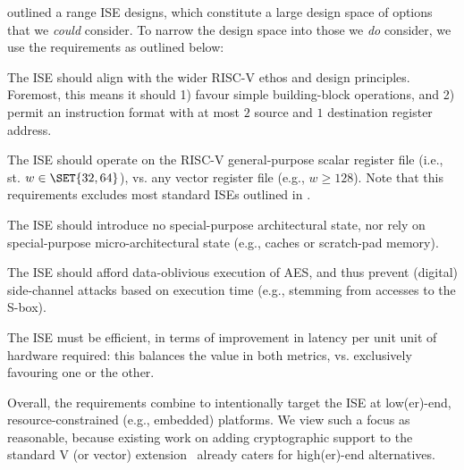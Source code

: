 
outlined a range ISE designs, which constitute a large design space of
options that we {\em could} consider.  To narrow the design space into
those we {\em do} consider, we use the requirements as outlined below:

\begin{requirement}
The ISE should align with the wider RISC-V ethos and design principles.
Foremost, this means it should 
1) favour simple building-block operations,
   and
2) permit an instruction format with at most $2$ source and $1$ destination register address.
\end{requirement}

\begin{requirement}
The ISE should operate on 
the RISC-V general-purpose scalar register file 
(i.e., st. $w \in \SET{32,64}$),
vs. 
any                        vector register file
(e.g., $w \ge 128$).
Note that this requirements excludes most standard ISEs outlined in 
.
\end{requirement}

\begin{requirement}
The ISE should introduce no
special-purpose       architectural state, 
nor rely on
special-purpose micro-architectural state
(e.g., caches or scratch-pad memory).
\end{requirement}

\begin{requirement}
The ISE should afford data-oblivious execution of AES, and thus prevent 
(digital) side-channel attacks based on execution time 
(e.g., stemming from accesses to the S-box).
\end{requirement}


\begin{requirement}
The ISE must be efficient, in terms of improvement in latency per unit
unit of hardware required: this balances the value in both metrics, vs.
exclusively favouring one or the other.
\end{requirement}

\noindent
Overall, the requirements combine to intentionally target the ISE at 
 low(er)-end,
resource-constrained (e.g., embedded) platforms.  
We view such a focus as reasonable, because existing work on adding
cryptographic support to the
standard V 
(or vector) 
extension~\cite[Section 21]{RV:ISA:I:19}
already caters for
high(er)-end
alternatives.

